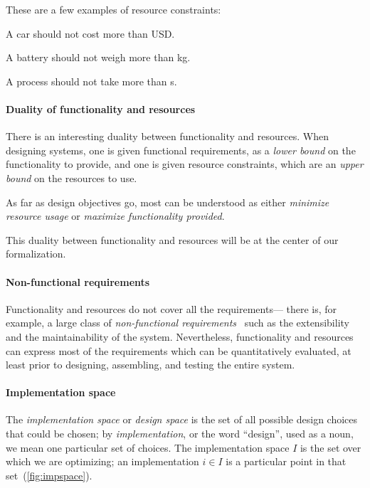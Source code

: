 \begin{example}
These are a few examples of resource constraints:
\begin{compactitem}
\item A car should not cost more than \unit[15,000]{USD}.
\item A battery should not weigh more than \unit[1]{kg}.
\item A process should not take more than \unit[10]{s}.
\end{compactitem}
\end{example}

\paragraph{Duality of functionality and resources}

There is an interesting duality between functionality and resources. When designing systems, one is given functional requirements, as a \emph{lower bound} on the
functionality to provide, and one is given resource constraints, which are an \emph{upper bound} on the
resources to use.

As far as design objectives go, most can be understood as either \emph{minimize resource usage}
or \emph{maximize functionality provided}.

This duality between functionality and resources will be at the
center of our formalization.

\paragraph{Non-functional requirements}

Functionality and resources do not cover all the requirements--- there is, for example, a
large class of \emph{non-functional requirements}~\cite{??} such as the extensibility and the
maintainability of the system. Nevertheless, functionality and resources can express most of
the requirements which can be quantitatively evaluated, at least prior to designing, assembling,
and testing the entire system.

\paragraph{Implementation space}

The \emph{implementation space} or \textit{design space} is the set of all possible design choices that could be chosen;
by \textit{implementation}, or the word ``design'', used as a noun, we mean one particular  set of choices. The implementation space $I$ is the set over which we are optimizing; an implementation $i\in I$ is a particular point in that set~(\cref{fig:impspace}).


